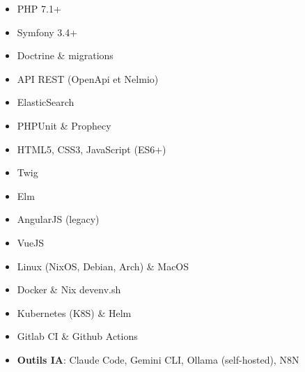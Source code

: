 \documentclass[11pt, a4paper]{libs/awesome-cv/awesome-cv}
\begin{document}

\begin{itemize}[label=\textbullet]
	\item PHP 7.1+
	\item Symfony 3.4+
	\item Doctrine \& migrations
	\item API REST (OpenApi et Nelmio)
	\item ElasticSearch
	\item PHPUnit \& Prophecy
\end{itemize}

\begin{itemize}[label=\textbullet]
	\item HTML5, CSS3, JavaScript (ES6+)
	\item Twig
	\item Elm
	\item AngularJS (legacy)
	\item VueJS
\end{itemize}

\begin{itemize}[label=\textbullet]
	\item Linux (NixOS, Debian, Arch) \& MacOS
	\item Docker \& Nix devenv.sh
	\item Kubernetes (K8S) \& Helm
	\item Gitlab CI \& Github Actions
	\item \textbf{Outils IA}: Claude Code, Gemini CLI, Ollama (self-hosted), N8N
\end{itemize}






\end{document}
